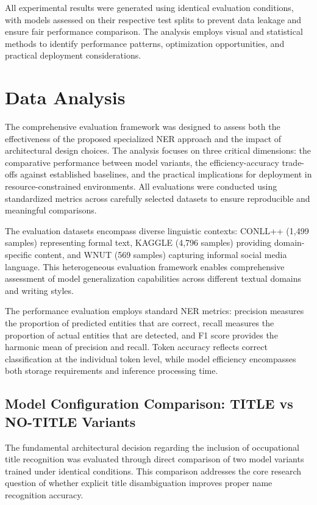 \documentclass[a4paper]{usiinfbachelorproject}
\begin{document}
All experimental results were generated using identical evaluation conditions, with models assessed on their respective test splits to prevent data leakage and ensure fair performance comparison. The analysis employs visual and statistical methods to identify performance patterns, optimization opportunities, and practical deployment considerations.


\section{Data Analysis}

The comprehensive evaluation framework was designed to assess both the effectiveness of the proposed specialized NER approach and the impact of architectural design choices. The analysis focuses on three critical dimensions: the comparative performance between model variants, the efficiency-accuracy trade-offs against established baselines, and the practical implications for deployment in resource-constrained environments. All evaluations were conducted using standardized metrics across carefully selected datasets to ensure reproducible and meaningful comparisons.

The evaluation datasets encompass diverse linguistic contexts: CONLL++ (1,499 samples) representing formal text, KAGGLE (4,796 samples) providing domain-specific content, and WNUT (569 samples) capturing informal social media language. This heterogeneous evaluation framework enables comprehensive assessment of model generalization capabilities across different textual domains and writing styles.

The performance evaluation employs standard NER metrics: precision measures the proportion of predicted entities that are correct, recall measures the proportion of actual entities that are detected, and F1 score provides the harmonic mean of precision and recall. Token accuracy reflects correct classification at the individual token level, while model efficiency encompasses both storage requirements and inference processing time.

\subsection{Model Configuration Comparison: TITLE vs NO-TITLE Variants}

The fundamental architectural decision regarding the inclusion of occupational title recognition was evaluated through direct comparison of two model variants trained under identical conditions. This comparison addresses the core research question of whether explicit title disambiguation improves proper name recognition accuracy.
\end{document}
